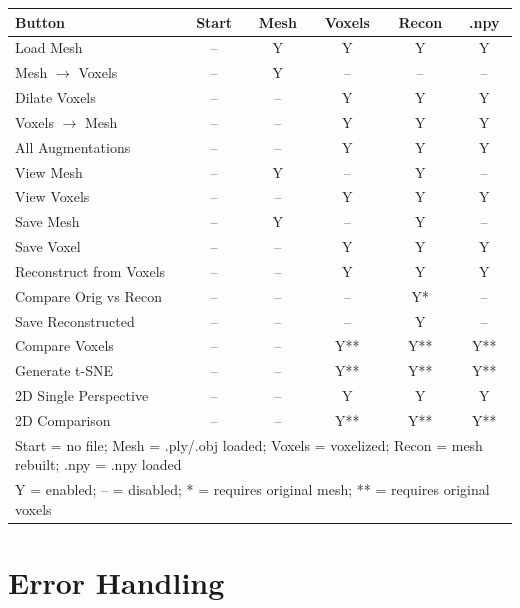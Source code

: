 \documentclass[12pt,a4paper]{article}
\begin{document}
\begin{table}[H]
\centering
\small
\begin{tabular}{lccccc}
\toprule
\textbf{Button} & \textbf{Start} & \textbf{Mesh} & \textbf{Voxels} & \textbf{Recon} & \textbf{.npy} \\
\midrule
Load Mesh                   & -- & Y & Y & Y & Y \\
Mesh $\rightarrow$ Voxels  & -- & Y & -- & -- & -- \\
Dilate Voxels               & -- & -- & Y & Y & Y \\
Voxels $\rightarrow$ Mesh  & -- & -- & Y & Y & Y \\
\addlinespace
All Augmentations           & -- & -- & Y & Y & Y \\
\midrule
View Mesh                   & -- & Y & -- & Y & -- \\
View Voxels                 & -- & -- & Y & Y & Y \\
Save Mesh                   & -- & Y & -- & Y & -- \\
Save Voxel                  & -- & -- & Y & Y & Y \\
\midrule
Reconstruct from Voxels     & -- & -- & Y & Y & Y \\
Compare Orig vs Recon       & -- & -- & -- & Y* & -- \\
Save Reconstructed          & -- & -- & -- & Y & -- \\
Compare Voxels              & -- & -- & Y** & Y** & Y** \\
Generate t-SNE              & -- & -- & Y** & Y** & Y** \\
\midrule
2D Single Perspective       & -- & -- & Y & Y & Y \\
2D Comparison               & -- & -- & Y** & Y** & Y** \\
\bottomrule
\multicolumn{6}{l}{\footnotesize Start = no file; Mesh = .ply/.obj loaded; Voxels = voxelized; Recon = mesh rebuilt; .npy = .npy loaded} \\
\multicolumn{6}{l}{\footnotesize Y = enabled; -- = disabled; * = requires original mesh; ** = requires original voxels} \\
\end{tabular}
\normalsize
\end{table}

\section{Error Handling}
\end{document}
